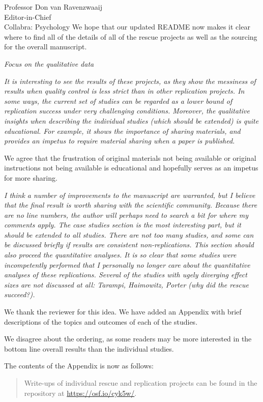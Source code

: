 \documentclass{stanfordletter}
\newcommand{\theysaid}[1]{\begin{leftbar} \noindent 
		\textsl{ #1}\end{leftbar}}
\newcommand{\revised}[1]{\begin{quote}	#1 \end{quote}}
\begin{document}
\begin{letter}{Professor Don van Ravenzwaaij \\ Editor-in-Chief \\ Collabra: Psychology }
		We hope that our updated README now makes it clear where to find all of the details of all of the rescue projects as well as the sourcing for the overall manuscript. 
		
		
		\theysaid{Focus on the qualitative data}
		\theysaid{It is interesting to see the results of these projects, as they show the messiness of results when quality control is less strict than in other replication projects. In some ways, the current set of studies can be regarded as a lower bound of replication success under very challenging conditions. Moreover, the qualitative insights when describing the individual studies (which should be extended) is quite educational. For example, it shows the importance of sharing materials, and provides an impetus to require material sharing when a paper is published.}
		
		We agree that the frustration of original materials not being available or original instructions not being available is educational and hopefully serves as an impetus for more sharing. 
		
		\theysaid{ I think a number of improvements to the manuscript are warranted, but I believe that the final result is worth sharing with the scientific community. Because there are no line numbers, the author will perhaps need to search a bit for where my comments apply.
		The case studies section is the most interesting part, but it should be extended to all studies.
		 There are not too many studies, and some can be discussed briefly if results are consistent non-replications. This section should also proceed the quantitative analyses. It is so clear that some studies were incompetently performed that I personally no longer care about the quantitative analyses of these replications. Several of the studies with ugely diverging effect sizes are not discussed at all: Tarampi, Haimowitz, Porter (why did the rescue succeed?).}
		 
		 
		 We thank the reviewer for this idea. We have added an Appendix with brief descriptions of the topics and outcomes of each of the studies. 
		 
		  We disagree about the ordering, as some readers may be more interested in the bottom line overall results than the individual studies.
		 
		 The contents of the Appendix is now as follows:
		 
		 \revised{
		 	
		 	Write-ups of individual rescue and replication projects can be found in the repository at \url{https://osf.io/cyk5w/}.
		 	\newline
		 	
}
\end{letter}
\end{document}
